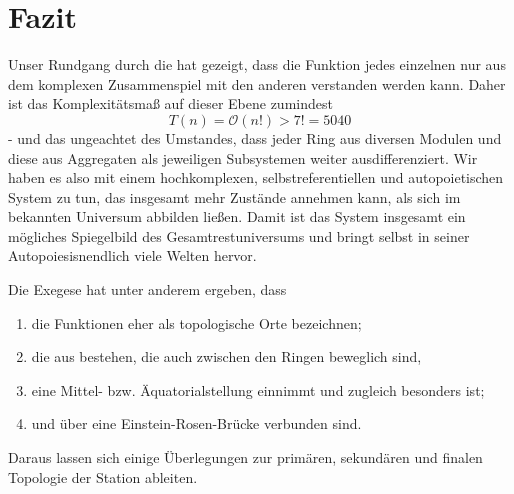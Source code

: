 \section*{Fazit}\label{sec:fazit}

Unser Rundgang durch die  hat gezeigt, dass die Funktion jedes einzelnen  nur aus dem komplexen Zusammenspiel mit den anderen  verstanden werden kann. Daher ist das Komplexitätsmaß auf dieser Ebene zumindest
\begin{equation}
    T(n) = \mathcal{O} (n!) > 7! = 5040
\end{equation}
- und das ungeachtet des Umstandes, dass jeder Ring aus diversen Modulen und diese aus Aggregaten als jeweiligen Subsystemen weiter ausdifferenziert. Wir haben es also mit einem hochkomplexen, selbstreferentiellen und autopoietischen System zu tun, das insgesamt mehr Zustände annehmen kann, als sich im bekannten Universum abbilden ließen. Damit ist das System insgesamt ein mögliches Spiegelbild des Gesamtrestuniversums und bringt selbst in seiner Autopoiesisnendlich viele Welten hervor.

Die Exegese hat unter anderem ergeben, dass 
\begin{enumerate}
    \item die  Funktionen eher als topologische Orte bezeichnen;
    \item die  aus  bestehen, die auch zwischen den Ringen beweglich sind,
    \item {} eine Mittel- bzw. Äquatorialstellung einnimmt und zugleich besonders  ist;
    \item {} und  über eine Einstein-Rosen-Brücke verbunden sind.
\end{enumerate}

Daraus lassen sich einige Überlegungen zur primären, sekundären und finalen Topologie der Station ableiten.

